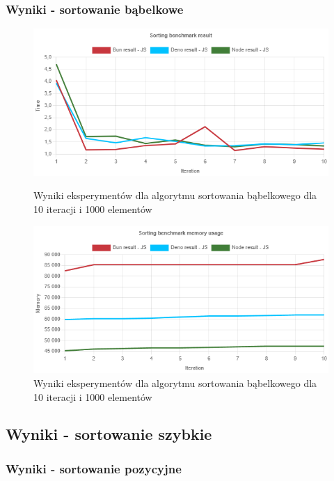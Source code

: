 \subsubsection{Wyniki - sortowanie bąbelkowe}
\begin{figure}[H]
    \includegraphics[width=\linewidth]{Figures/sorting/bubble/e1_js.png}
    \caption{Wyniki eksperymentów dla algorytmu sortowania bąbelkowego dla 10 iteracji i 1000 elementów}
    \label{fig:bubble_sorting_e1}
  \endminipage\hfill
  \includegraphics[width=\linewidth]{Figures/sorting/bubble/e1_memory_js.png}
  \caption{Wyniki eksperymentów dla algorytmu sortowania bąbelkowego dla 10 iteracji i 1000 elementów}
  \label{fig:bubble_sorting_e1_memory_js}
  \endminipage\hfill
\end{figure}

\subsection{Wyniki - sortowanie szybkie}

\subsubsection{Wyniki - sortowanie pozycyjne}

